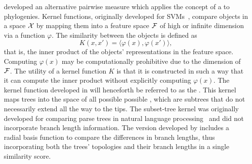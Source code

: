 \textcite{poon2013mapping} developed an alternative pairwise measure which
applies the concept of a  to phylogenies. Kernel
functions, originally developed for \glspl{SVM}~\autocite{burges1998tutorial}, 
compare objects in a space $\mathcal{X}$ by mapping them into a feature space $\mathcal{F}$ of
high or infinite dimension via a function $\varphi$. The similarity between the
objects is defined as
\[  
  K(x, x') = \langle \varphi(x), \varphi(x')\rangle,
\]
that is, the inner product of the objects' representations in the feature
space. Computing $\varphi(x)$ may be computationally prohibitive due to the
dimension of $\mathcal{F}$. The utility of a kernel function $K$ is that it is
constructed in such a way that it can compute the inner product without
explicitly computing $\varphi(x)$. The kernel function developed in
\autocite{poon2013mapping} will henceforth be referred to as the . This kernel maps trees into the space of all possible possible
, which are subtrees that do not necessarily extend all the
way to the tips. The subset-tree kernel was originally developed for comparing
parse trees in natural language processing~\autocite{collins2002new} and did
not incorporate branch length information. The version developed by
\textcite{poon2013mapping} includes a radial basis function to compare the
differences in branch lengths, thus incorporating both the trees' topologies
and their branch lengths in a single similarity score. 

